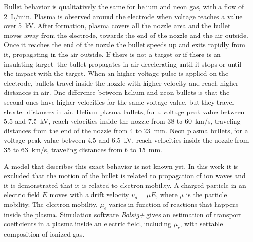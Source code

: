 Bullet behavior is qualitatively the same for helium and neon gas, with a flow of \SI{2}{\liter/\minute}.
Plasma is observed around the electrode when voltage reaches a value over \SI{5}{\kilo\volt}. After formation, plasma covers all the nozzle area and the bullet moves away from the electrode, towards the end of the nozzle and the air outside. Once it reaches the end of the nozzle the bullet speeds up and exits rapidly from it, propagating in the air outside. If there is not a target or if there is an insulating target, the bullet propagates in air decelerating until it stops or until the impact with the target.
When an higher voltage pulse is applied on the electrode, bullets travel inside the nozzle with higher velocity and reach higher distances in air. One difference between helium and neon bullets is that the second ones have higher velocities for the same voltage value, but they travel shorter distances in air. Helium plasma bullets, for a voltage peak value between \num{5.5} and \SI{7.5}{\kilo\volt}, reach velocities inside the nozzle from \num{38} to \SI{60}{\kilo\meter/\second}, traveling distances from the end of the nozzle from \num{4} to \SI{23}{\milli\meter}. Neon plasma bullets, for a voltage peak value between \num{4.5} and \SI{6.5}{\kilo\volt}, reach velocities inside the nozzle from \num{35} to \SI{63}{\kilo\meter/\second}, traveling distances from \num{6} to \SI{15}{\milli\meter}.

A model that describes this exact behavior is not known yet. In this work it is excluded that the motion of the bullet is related to propagation of ion waves and it is demonstrated that it is related to electron mobility. A charged particle in an electric field $E$ moves with a drift velocity $v_{d} = \mu E$, where $\mu$ is the particle mobility. The electron mobility, $\mu_e$ varies in function of reactions that happens inside the plasma. Simulation software \emph{Bolsig+} gives an estimation of transport coefficients in a plasma inside an electric field, including $\mu_e$, with settable composition of ionized gas.

